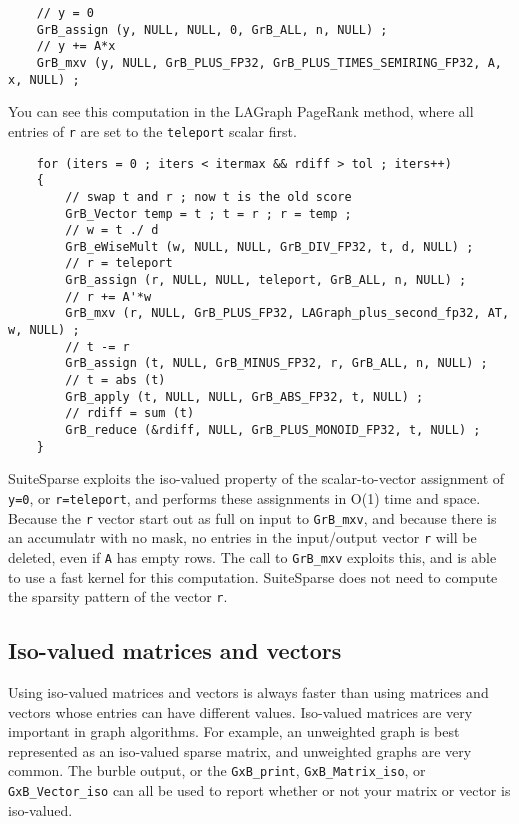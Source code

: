 \documentclass[12pt]{article}
\begin{document}
{    {\scriptsize
    \begin{verbatim}
    // y = 0
    GrB_assign (y, NULL, NULL, 0, GrB_ALL, n, NULL) ;
    // y += A*x
    GrB_mxv (y, NULL, GrB_PLUS_FP32, GrB_PLUS_TIMES_SEMIRING_FP32, A, x, NULL) ; \end{verbatim}}

You can see this computation in the LAGraph PageRank method, where all
entries of \verb'r' are set to the \verb'teleport' scalar first.

    {\scriptsize
    \begin{verbatim}
    for (iters = 0 ; iters < itermax && rdiff > tol ; iters++)
    {
        // swap t and r ; now t is the old score
        GrB_Vector temp = t ; t = r ; r = temp ;
        // w = t ./ d
        GrB_eWiseMult (w, NULL, NULL, GrB_DIV_FP32, t, d, NULL) ;
        // r = teleport
        GrB_assign (r, NULL, NULL, teleport, GrB_ALL, n, NULL) ;
        // r += A'*w
        GrB_mxv (r, NULL, GrB_PLUS_FP32, LAGraph_plus_second_fp32, AT, w, NULL) ;
        // t -= r
        GrB_assign (t, NULL, GrB_MINUS_FP32, r, GrB_ALL, n, NULL) ;
        // t = abs (t)
        GrB_apply (t, NULL, NULL, GrB_ABS_FP32, t, NULL) ;
        // rdiff = sum (t)
        GrB_reduce (&rdiff, NULL, GrB_PLUS_MONOID_FP32, t, NULL) ;
    } \end{verbatim}}

SuiteSparse exploits the iso-valued property of the scalar-to-vector assignment
of \verb'y=0', or \verb'r=teleport', and performs these assignments in O(1)
time and space.  Because the \verb'r' vector start out as full on input to
\verb'GrB_mxv', and because there is an accumulatr with no mask, no entries in
the input/output vector \verb'r' will be deleted, even if \verb'A' has empty
rows.  The call to \verb'GrB_mxv' exploits this, and is able to use a fast
kernel for this computation.  SuiteSparse does not need to compute the sparsity
pattern of the vector \verb'r'.

\subsection{Iso-valued matrices and vectors}

Using iso-valued matrices and vectors is always faster than using matrices and
vectors whose entries can have different values.  Iso-valued matrices are very
important in graph algorithms.  For example, an unweighted graph is best
represented as an iso-valued sparse matrix, and unweighted graphs are very
common.  The burble output, or the \verb'GxB_print', \verb'GxB_Matrix_iso', or
\verb'GxB_Vector_iso' can all be used to report whether or not your matrix or
vector is iso-valued.

}
\end{document}
